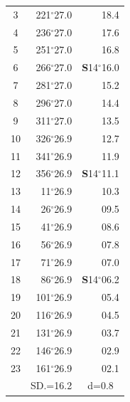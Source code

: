 \documentclass[10pt, a4paper]{report}
\begin{document}
\begin{scriptsize}
\begin{tabular*}{0.2\textwidth}[t]{@{\extracolsep{\fill}}|c|rr|}
3 & 221$^\circ$27.0 & \raisebox{0.24ex}{\boldmath$\cdot$~\boldmath$\cdot$~~}18.4\\
4 & 236$^\circ$27.0 & 17.6\\
5 & 251$^\circ$27.0 & 16.8\\[2Pt]
6 & 266$^\circ$27.0 & \textbf{S}14$^\circ$16.0\\
7 & 281$^\circ$27.0 & 15.2\\
8 & 296$^\circ$27.0 & 14.4\\
9 & 311$^\circ$27.0 & \raisebox{0.24ex}{\boldmath$\cdot$~\boldmath$\cdot$~~}13.5\\
10 & 326$^\circ$26.9 & 12.7\\
11 & 341$^\circ$26.9 & 11.9\\[2Pt]
12 & 356$^\circ$26.9 & \textbf{S}14$^\circ$11.1\\
13 & 11$^\circ$26.9 & 10.3\\
14 & 26$^\circ$26.9 & 09.5\\
15 & 41$^\circ$26.9 & \raisebox{0.24ex}{\boldmath$\cdot$~\boldmath$\cdot$~~}08.6\\
16 & 56$^\circ$26.9 & 07.8\\
17 & 71$^\circ$26.9 & 07.0\\[2Pt]
18 & 86$^\circ$26.9 & \textbf{S}14$^\circ$06.2\\
19 & 101$^\circ$26.9 & 05.4\\
20 & 116$^\circ$26.9 & 04.5\\
21 & 131$^\circ$26.9 & \raisebox{0.24ex}{\boldmath$\cdot$~\boldmath$\cdot$~~}03.7\\
22 & 146$^\circ$26.9 & 02.9\\
23 & 161$^\circ$26.9 & 02.1\\
\hline
\rule{0pt}{2.4ex} & \multicolumn{1}{c}{SD.=16.2} & \multicolumn{1}{c|}{d=0.8}\\
\hline
\end{tabular*}

\end{scriptsize}
\end{document}
